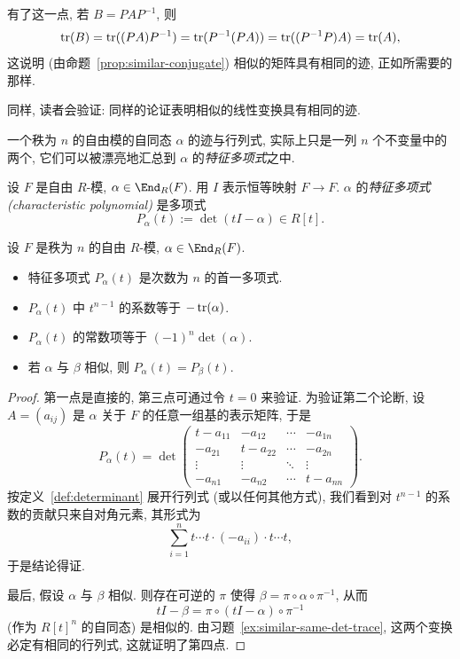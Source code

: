 有了这一点, 若 $B=PAP^{-1}$, 则
\[
\operatorname{tr}(B)=\operatorname{tr}((PA)P^{-1})=\operatorname{tr}(P^{-1}(PA))=\operatorname{tr}((P^{-1}P)A)=\operatorname{tr}(A),
\]
这说明 (由命题~\ref{prop:similar-conjugate}) 相似的矩阵具有相同的迹, 正如所需要的那样.

同样, 读者会验证: 同样的论证表明相似的线性变换具有相同的迹.

一个秩为 $n$ 的自由模的自同态 $\alpha$ 的迹与行列式, 实际上只是一列 $n$ 个不变量中的两个, 它们可以被漂亮地汇总到 $\alpha$ 的\emph{特征多项式}之中.

\begin{definition}\label{def:char-polynomial}
设 $F$ 是自由 $R$-模, $\alpha\in\End_R(F)$. 用 $I$ 表示恒等映射 $F\to F$. $\alpha$ 的\emph{特征多项式 (characteristic polynomial)}
是多项式
\[
P_\alpha(t):=\det(tI-\alpha)\in R[t].
\]
\end{definition}

\begin{proposition}\label{prop:charpoly-coefficients}
设 $F$ 是秩为 $n$ 的自由 $R$-模, $\alpha\in\End_R(F)$.
\begin{itemize}
	\item 特征多项式 $P_\alpha(t)$ 是次数为 $n$ 的首一多项式.
	\item $P_\alpha(t)$ 中 $t^{n-1}$ 的系数等于 $-\operatorname{tr}(\alpha)$.
	\item $P_\alpha(t)$ 的常数项等于 $(-1)^n\det(\alpha)$.
	\item 若 $\alpha$ 与 $\beta$ 相似, 则 $P_\alpha(t)=P_\beta(t)$.
\end{itemize}
\end{proposition}

\begin{proof}
第一点是直接的, 第三点可通过令 $t=0$ 来验证. 为验证第二个论断, 设 $A=(a_{ij})$ 是 $\alpha$ 关于 $F$ 的任意一组基的表示矩阵, 于是
\[
P_\alpha(t)=\det\begin{pmatrix}
t-a_{11}&-a_{12}&\cdots&-a_{1n}\\
-a_{21}&t-a_{22}&\cdots&-a_{2n}\\
\vdots&\vdots&\ddots&\vdots\\
-a_{n1}&-a_{n2}&\cdots&t-a_{nn}
\end{pmatrix}.
\]
按定义~\ref{def:determinant} 展开行列式 (或以任何其他方式), 我们看到对 $t^{n-1}$ 的系数的贡献只来自对角元素, 其形式为
\[
\sum_{i=1}^n t\cdots t\cdot(-a_{ii})\cdot t\cdots t,
\]
于是结论得证.

最后, 假设 $\alpha$ 与 $\beta$ 相似. 则存在可逆的 $\pi$ 使得 $\beta=\pi\circ\alpha\circ\pi^{-1}$, 从而
\[
tI-\beta=\pi\circ(tI-\alpha)\circ\pi^{-1}
\]
(作为 $R[t]^n$ 的自同态) 是相似的. 由习题~\ref{ex:similar-same-det-trace}, 这两个变换必定有相同的行列式, 这就证明了第四点.
\end{proof}

